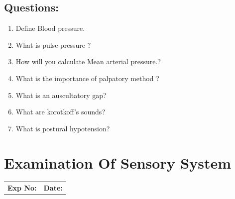 \documentclass[a4paper,12pt,openany,oneside]{book}
\begin{document}
\section*{Questions:}
\begin{enumerate}
\item{Define Blood pressure.}
\item{What is pulse pressure ?}
\item{How will you calculate Mean arterial pressure.?}
\item{What is the importance of palpatory method ?}
\item{What is an auscultatory gap?}
\item{What are korotkoff’s sounds?}
\item{What is postural hypotension?}
\end{enumerate}

															\chapter*{\centering Examination Of Sensory System}
															\begin{tabular}{p{5in} p{1in}}
																\textbf{Exp No:}  & \textbf{Date:}\\
															\end{tabular}
\end{document}
